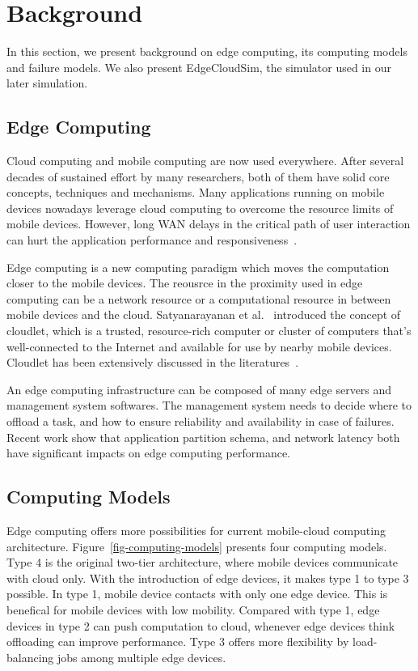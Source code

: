 \section{Background}
\label{sec:background}

In this section, we present background on edge computing, its computing models and failure models.
We also present EdgeCloudSim, the simulator used in our later simulation.

\subsection{Edge Computing}
Cloud computing and mobile computing are now used everywhere.
After several decades of sustained effort by many researchers, both of them have
solid core concepts, techniques and mechanisms. Many applications running on mobile devices nowadays
leverage cloud computing to overcome the resource limits of mobile devices. However,
long WAN delays in the critical path of user interaction can hurt the application
performance and responsiveness~\cite{cloudlets09}.




Edge computing is a new computing paradigm which moves the computation closer to the mobile devices.
The reousrce in the proximity used in edge computing can be a network resource or a computational resource
in between mobile devices and the cloud. Satyanarayanan et al.~\cite{cloudlets09} introduced the concept
of cloudlet, which is a trusted, resource-rich computer or cluster of computers that's well-connected to
the Internet and available for use by nearby mobile devices. Cloudlet has been extensively discussed in the
literatures~\cite{edge-computing, Cloudlets12,hu-apsys16,ChaufournierSLN17}.

An edge computing infrastructure can be composed of many edge servers and management system softwares.
The management system needs to decide where to offload a task, and how to ensure reliability and availability
in case of failures. Recent work \cite{hu-apsys16,COMET} show that application partition schema, and network latency
both have significant impacts on edge computing performance.

\subsection{Computing Models}
\label{sec:computing-models}
Edge computing offers more possibilities for current mobile-cloud computing architecture.
Figure~\ref{fig-computing-models} presents four computing models. Type 4 is the original
two-tier architecture, where mobile devices communicate with cloud only. With the introduction of
edge devices, it makes type 1 to type 3 possible. In type 1, mobile device contacts with only one edge device.
This is benefical for mobile devices with low mobility. Compared with type 1, edge devices in type 2 can
push computation to cloud, whenever edge devices think offloading can improve performance. Type 3 offers
more flexibility by load-balancing jobs among multiple edge devices.


